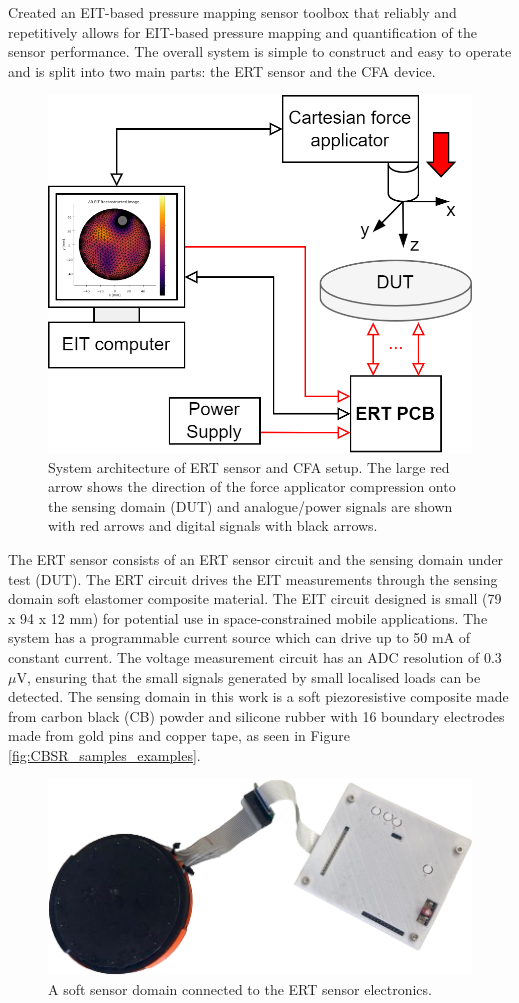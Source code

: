 Created an EIT-based pressure mapping sensor toolbox that reliably and repetitively allows for EIT-based pressure mapping and quantification of the sensor performance. The overall system is simple to construct and easy to operate and is split into two main parts: the ERT sensor and the CFA device.
\begin{figure}[H]
\centering
\includegraphics[width=0.4\linewidth]{Figures/ERT_PCB_and_CFA_system_simple.png}
\caption{System architecture of ERT sensor and CFA setup. The large red arrow shows the direction of the force applicator compression onto the sensing domain (DUT) and analogue/power signals are shown with red arrows and digital signals with black arrows.}
\label{fig:ERT_PCB_CFA_archit}
\end{figure}
The ERT sensor consists of an ERT sensor circuit and the sensing domain under test (DUT). The ERT circuit drives the EIT measurements through the sensing domain soft elastomer composite material. The EIT circuit designed is small (79 x 94 x 12 mm) for potential use in space-constrained mobile applications. 
The system has a programmable current source which can drive up to 50 mA of constant current. The voltage measurement circuit has an ADC resolution of 0.3 $\mu$V, ensuring that the small signals generated by small localised loads can be detected. The sensing domain in this work is a soft piezoresistive composite made from carbon black (CB) powder and silicone rubber with 16 boundary electrodes made from gold pins and copper tape, as seen in Figure \ref{fig:CBSR_samples_examples}.
\begin{figure}[H]
\centering
\includegraphics[width=0.50\linewidth]{Figures/ert_pcb_and_DUT.png}
\caption{A soft sensor domain connected to the ERT sensor electronics.}
\label{fig:ert_sensor}
\end{figure}
